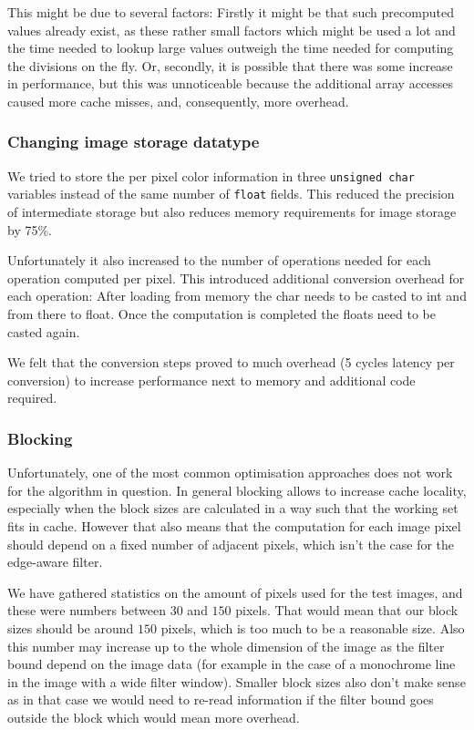 This might be due to several factors:
Firstly it might be that such precomputed values already exist, as these rather small factors which might be used a lot and the time needed to lookup large values outweigh the time needed for computing the divisions on the fly. Or, secondly, it is possible that there was some increase in performance, but this was unnoticeable because the additional array accesses caused more cache misses, and, consequently, more overhead.

\subsubsection{Changing image storage datatype}

We tried to store the per pixel color information in three \texttt{unsigned char} variables instead of the same number of \texttt{float} fields. This reduced the precision of intermediate storage but also reduces memory requirements for image storage by 75\%.
 
Unfortunately it also increased to the number of operations needed for each operation computed per pixel.  
This introduced additional conversion overhead for each operation: After loading from memory the char needs to be casted to int and from there to float. Once the computation is completed the floats need to be casted again. 

We felt that the conversion steps proved to much overhead (5 cycles latency per conversion) to increase performance next to memory and additional code required.

\subsubsection{Blocking}

Unfortunately, one of the most common optimisation approaches does not work for the algorithm in question. In general blocking allows to increase cache locality, especially when the block sizes are calculated in a way such that the working set fits in cache. However that also means that the computation for each image pixel should depend on a fixed number of adjacent pixels, which isn't the case for the edge-aware filter.

We have gathered statistics on the amount of pixels used for the test images, and these were numbers between $30$ and $150$ pixels. That would mean that our block sizes should be around $150$ pixels, which is too much to be a reasonable size. Also this number may increase up to the whole dimension of the image as the filter bound depend on the image data (for example in the case of a monochrome line in the image with a wide filter window). Smaller block sizes also don't make sense as in that case we would need to re-read information if the filter bound goes outside the block which would mean more overhead. 

